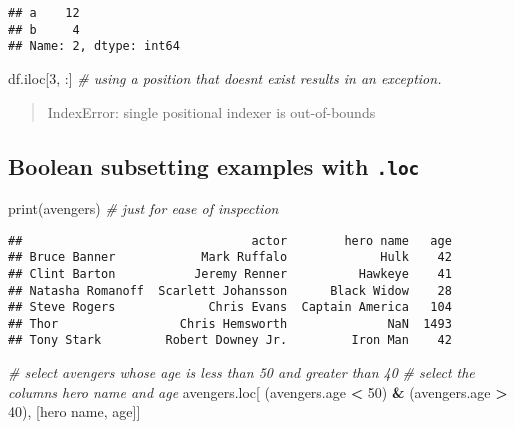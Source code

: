 \documentclass[
]{book}
\newenvironment{Shaded}{\begin{snugshade}}{\end{snugshade}}
\newcommand{\BuiltInTok}[1]{#1}
\newcommand{\CommentTok}[1]{\textcolor[rgb]{0.56,0.35,0.01}{\textit{#1}}}
\newcommand{\DecValTok}[1]{\textcolor[rgb]{0.00,0.00,0.81}{#1}}
\newcommand{\NormalTok}[1]{#1}
\newcommand{\OperatorTok}[1]{\textcolor[rgb]{0.81,0.36,0.00}{\textbf{#1}}}
\newcommand{\StringTok}[1]{\textcolor[rgb]{0.31,0.60,0.02}{#1}}
\begin{document}
\begin{verbatim}
## a    12
## b     4
## Name: 2, dtype: int64
\end{verbatim}

\begin{Shaded}
\begin{Highlighting}[]
\NormalTok{df.iloc[}\DecValTok{3}\NormalTok{, :] }\CommentTok{\# using a position that doesn\textquotesingle{}t exist results in an exception. }
\end{Highlighting}
\end{Shaded}

\begin{quote}
IndexError: single positional indexer is out-of-bounds
\end{quote}

\hypertarget{boolean-subsetting-examples-with-.loc}{%
\subsection{\texorpdfstring{Boolean subsetting examples with \texttt{.loc}}{Boolean subsetting examples with .loc}}\label{boolean-subsetting-examples-with-.loc}}

\begin{Shaded}
\begin{Highlighting}[]
\BuiltInTok{print}\NormalTok{(avengers) }\CommentTok{\# just for ease of inspection}
\end{Highlighting}
\end{Shaded}

\begin{verbatim}
##                                actor        hero name   age
## Bruce Banner            Mark Ruffalo             Hulk    42
## Clint Barton           Jeremy Renner          Hawkeye    41
## Natasha Romanoff  Scarlett Johansson      Black Widow    28
## Steve Rogers             Chris Evans  Captain America   104
## Thor                 Chris Hemsworth              NaN  1493
## Tony Stark         Robert Downey Jr.         Iron Man    42
\end{verbatim}

\begin{Shaded}
\begin{Highlighting}[]
\CommentTok{\# select avengers whose age is less than 50 and greater than 40}
\CommentTok{\# select the columns \textquotesingle{}hero name\textquotesingle{} and \textquotesingle{}age\textquotesingle{}}
\NormalTok{avengers.loc[ (avengers.age }\OperatorTok{\textless{}} \DecValTok{50}\NormalTok{) }\OperatorTok{\&}\NormalTok{ (avengers.age }\OperatorTok{\textgreater{}} \DecValTok{40}\NormalTok{), [}\StringTok{\textquotesingle{}hero name\textquotesingle{}}\NormalTok{, }\StringTok{\textquotesingle{}age\textquotesingle{}}\NormalTok{]]}
\end{Highlighting}
\end{Shaded}
\end{document}
